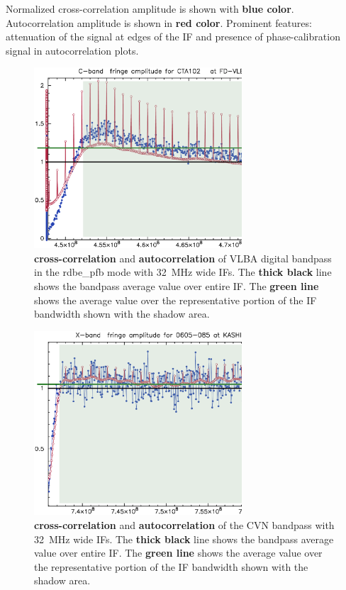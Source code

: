 \documentclass[11pt]{article}
\newcommand{\Grb}[1]{\textcolor{Dgreen}{\bf #1}}
\newcommand{\Rd}[1]{\textcolor{Dred}{\bf #1}}
\newcommand{\Bl}[1]{\textcolor{Dblue}{\bf #1}}
\begin{document}
   Normalized cross-correlation amplitude is shown with \Bl{blue color}.
Autocorrelation amplitude is shown in \Rd{red color}. Prominent features:
attenuation of the signal at edges of the IF and presence of phase-calibration
signal in autocorrelation plots.

\begin{figure}[h]
   \centerline{\includegraphics[width=0.69\textwidth]{plots/vlba_dbbs_bps.ps}}
   \caption{\Bl{cross-correlation} and \Rd{autocorrelation} of VLBA digital
             bandpass in the rdbe\_pfb mode with 32~MHz wide IFs. The {\bf 
             thick black} line shows the bandpass average value over entire 
             IF. The \Grb{green line} shows the average value over 
             the representative portion of the IF bandwidth shown with the 
             shadow area.}
   \label{f:vlba}
\end{figure}

\begin{figure}[h]
   \centerline{\includegraphics[width=0.69\textwidth]{plots/cvn_bps.ps}}
   \caption{\Bl{cross-correlation} and \Rd{autocorrelation} of the CVN
             bandpass with 32~MHz wide IFs. The {\bf 
             thick black} line shows the bandpass average value over entire 
             IF. The \Grb{green line} shows the average value over 
             the representative portion of the IF bandwidth shown with the 
             shadow area.}
   \label{f:cvn}
\end{figure}
\end{document}
